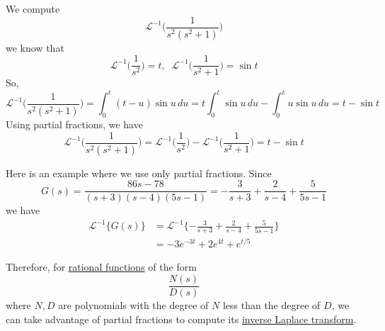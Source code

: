 \documentclass{article}
\newcounter{example}[section]
\begin{document}
    \begin{example}[Inverting $1/(s^2(s^2+1))$]
      \label{ex:inverting-1s2s21}
    We compute 
    \begin{equation}
      \mathcal{L}^{-1} \bigg( \frac{1}{s^2(s^2 + 1)}\bigg)
    \end{equation}
    we know that
    \begin{equation}
      \mathcal{L}^{-1} \bigg(\frac{1}{s^2}\bigg) = t, \;\; \mathcal{L}^{-1} \bigg( \frac{1}{s^2+1}\bigg) = \sin{t}
    \end{equation}
    So,
    \begin{equation}
      \mathcal{L}^{-1} \bigg( \frac{1}{s^2 (s^2+1)}\bigg) = \int_0^t (t-u) \sin{u} \,du = t \int_0^t \sin{u}\,du - \int_0^t u \sin{u}\,du = t - \sin{t}
    \end{equation}
    Using partial fractions, we have
    \begin{equation}
      \mathcal{L}^{-1} \bigg(\frac{1}{s^2(s^2 + 1)} \bigg) = \mathcal{L}^{-1} \bigg( \frac{1}{s^2} \bigg) - \mathcal{L}^{-1} \bigg(\frac{1}{s^2 + 1} \bigg) = t - \sin{t}
    \end{equation}
    \end{example}

    \begin{example}
      \label{ex:inversion-by-partial-fractions}
    Here is an example where we use only partial fractions. Since
    \begin{equation}
      G(s) = \frac{86 s - 78}{(s+3) (s - 4) (5s - 1)} = -\frac{3}{s+3} + \frac{2}{s-4} + \frac{5}{5s-1}
    \end{equation}
    we have 
    \begin{align*}
        \mathcal{L}^{-1} \{G(s)\} & = \mathcal{L}^{-1} \{-\frac{3}{s+3} + \frac{2}{s-4} + \frac{5}{5s-1}\} \\
        & = -3 e^{-3t} + 2 e^{4 t} + e^{t/5}
    \end{align*}
    \end{example}

    Therefore, for \hyperref[alg-def:rational-functions]{rational functions} of the form 
    \begin{equation}
      \frac{N(s)}{D(s)}
    \end{equation}
    where $N, D$ are polynomials with the degree of $N$ less than the degree of $D$, we can take advantage of partial fractions to compute its \hyperref[def:inverse-laplace-transform]{inverse Laplace transform}. 
\end{document}
